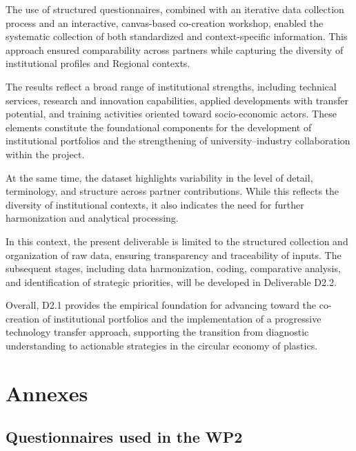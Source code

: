 \documentclass[
  12pt,
  oneside]{book}
\begin{document}
The use of structured questionnaires, combined with an iterative data
collection process and an interactive, canvas-based co-creation
workshop, enabled the systematic collection of both standardized and
context-specific information. This approach ensured comparability across
partners while capturing the diversity of institutional profiles and
Regional contexts.

The results reflect a broad range of institutional strengths, including
technical services, research and innovation capabilities, applied
developments with transfer potential, and training activities oriented
toward socio-economic actors. These elements constitute the foundational
components for the development of institutional portfolios and the
strengthening of university--industry collaboration within the project.

At the same time, the dataset highlights variability in the level of
detail, terminology, and structure across partner contributions. While
this reflects the diversity of institutional contexts, it also indicates
the need for further harmonization and analytical processing.

In this context, the present deliverable is limited to the structured
collection and organization of raw data, ensuring transparency and
traceability of inputs. The subsequent stages, including data
harmonization, coding, comparative analysis, and identification of
strategic priorities, will be developed in Deliverable D2.2.

Overall, D2.1 provides the empirical foundation for advancing toward the
co-creation of institutional portfolios and the implementation of a
progressive technology transfer approach, supporting the transition from
diagnostic understanding to actionable strategies in the circular
economy of plastics.

\appendix

\chapter{Annexes}\label{annexes}

\section{Questionnaires used in the
WP2}\label{questionnaires-used-in-the-wp2}


\end{document}
